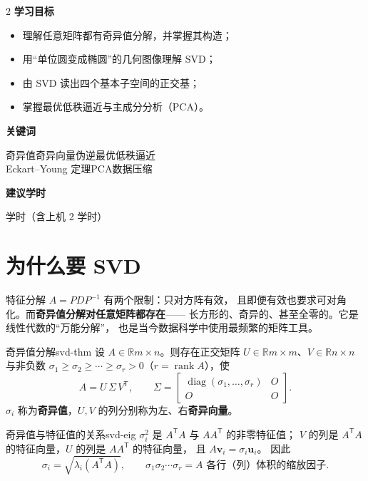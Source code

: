 \documentclass[11pt,a4paper,openany]{ctexbook}
\DeclareMathOperator{\rank}{rank}
\DeclareMathOperator{\diag}{diag}
\newcommand{\R}{\mathbb{R}}
\begin{document}
\begin{chapoutline}
\small
\begin{multicols}{2}
\textbf{学习目标}
\begin{itemize}[leftmargin=1.5em, itemsep=1.5pt]
\item 理解任意矩阵都有奇异值分解，并掌握其构造；
\item 用“单位圆变成椭圆”的几何图像理解 SVD；
\item 由 SVD 读出四个基本子空间的正交基；
\item 掌握最优低秩逼近与主成分分析（PCA）。
\end{itemize}
\columnbreak
\textbf{关键词}
\par\smallskip
奇异值\quad 奇异向量\quad 伪逆\quad 最优低秩逼近\\
Eckart--Young 定理\quad PCA\quad 数据压缩
\par\smallskip
\textbf{建议学时}
\par{} 学时（含上机 2 学时）
\end{multicols}
\end{chapoutline}

\section{为什么要 SVD}

特征分解 $A=PDP^{-1}$ 有两个限制：只对方阵有效，
且即便有效也要求可对角化。而\textbf{奇异值分解对任意矩阵都存在}——
长方形的、奇异的、甚至全零的。它是线性代数的“万能分解”，
也是当今数据科学中使用最频繁的矩阵工具。

\begin{thm}{奇异值分解}{svd-thm}
设 $A\in\R{m\times n}$。则存在正交矩阵
$U\in\R{m\times m}$、$V\in\R{n\times n}$ 与非负数
$\sigma_1\ge\sigma_2\ge\cdots\ge\sigma_r>0$（$r=\rank A$），使
\[
A=U\,\Sigma\,V^{\mathsf T},
\qquad
\Sigma=\begin{bmatrix}\diag(\sigma_1,\dots,\sigma_r)&O\\O&O\end{bmatrix}.
\]
$\sigma_i$ 称为\textbf{奇异值}，$U,V$ 的列分别称为左、右\textbf{奇异向量}。
\end{thm}

\begin{prop}{奇异值与特征值的关系}{svd-eig}
$\sigma_i^2$ 是 $A^{\mathsf T}A$ 与 $AA^{\mathsf T}$ 的非零特征值；
$V$ 的列是 $A^{\mathsf T}A$ 的特征向量，$U$ 的列是 $AA^{\mathsf T}$ 的特征向量，
且 $A\boldsymbol{v}_i=\sigma_i\boldsymbol{u}_i$。
因此
\[
\sigma_i=\sqrt{\lambda_i(A^{\mathsf T}A)},\qquad
\sigma_1\sigma_2\cdots\sigma_r=\text{$A$ 各行（列）体积的缩放因子}.
\]
\end{prop}
\end{document}
